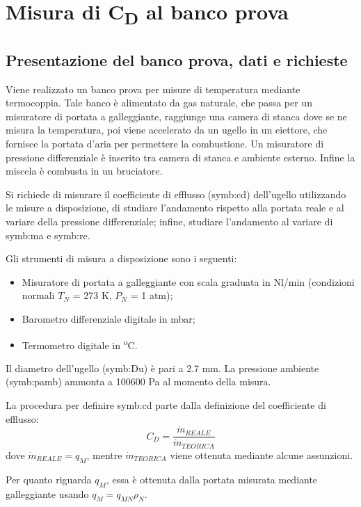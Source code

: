 \section{Misura di C\textsubscript{D} al banco prova}

\subsection{Presentazione del banco prova, dati e richieste}
Viene realizzato un banco prova per misure di temperatura mediante termocoppia. Tale banco è alimentato da gas naturale, che passa per un misuratore di portata a galleggiante, raggiunge una camera di stanca dove se ne misura la temperatura, poi viene accelerato da un ugello in un eiettore, che fornisce la portata d'aria per permettere la combustione. Un misuratore di pressione differenziale è inserito tra camera di stanca e ambiente esterno. Infine la miscela è combusta in un bruciatore. 

Si richiede di misurare il coefficiente di efflusso (\gls{symb:cd}) dell'ugello utilizzando le misure a disposizione, di studiare l'andamento rispetto alla portata reale e al variare della pressione differenziale; infine, studiare l'andamento al variare di \gls{symb:ma} e \gls{symb:re}.

Gli strumenti di misura a disposizione sono i seguenti:
\begin{itemize}
	\item Misuratore di portata a galleggiante con scala graduata in Nl/min (condizioni normali $T_N$ = 273 K, $P_N$ = 1 atm);
	\item Barometro differenziale digitale in mbar;
	\item Termometro digitale in \textsuperscript{o}C.
\end{itemize}

Il diametro dell'ugello (\gls{symb:Du}) è pari a 2.7 mm. La pressione ambiente (\gls{symb:pamb}) ammonta a 100600 Pa al momento della misura.

La procedura per definire \gls{symb:cd} parte dalla definizione del coefficiente di efflusso:
\begin{equation}
	C_D=\frac{\dot{m}_\textit{REALE}}{\dot{m}_\textit{TEORICA}}
\end{equation}
dove $\dot{m}_\textit{REALE} = q_M$, mentre $\dot{m}_\textit{TEORICA}$ viene ottenuta mediante alcune assunzioni. 

Per quanto riguarda $q_M$, essa è ottenuta dalla portata misurata mediante galleggiante usando $q_M=q_{MN} \rho_N$.

